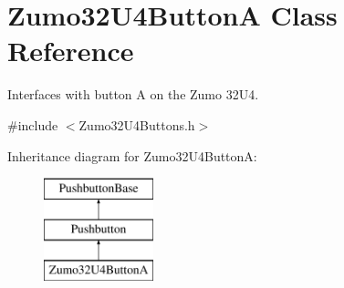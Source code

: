 \hypertarget{class_zumo32_u4_button_a}{}\section{Zumo32\+U4\+ButtonA Class Reference}
\label{class_zumo32_u4_button_a}


Interfaces with button A on the Zumo 32\+U4.  




{\ttfamily \#include $<$Zumo32\+U4\+Buttons.\+h$>$}

Inheritance diagram for Zumo32\+U4\+ButtonA\+:\begin{figure}[H]
\begin{center}
\leavevmode
\includegraphics[height=3.000000cm]{class_zumo32_u4_button_a}
\end{center}
\end{figure}

